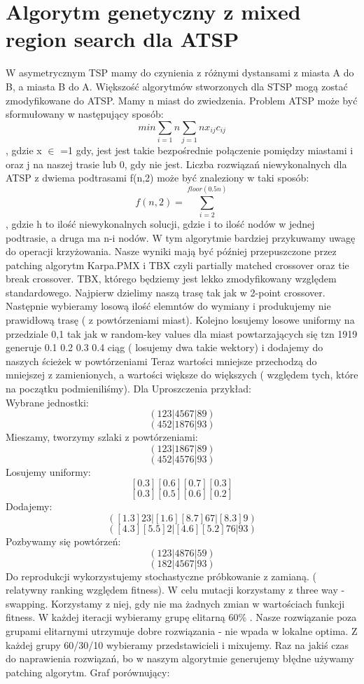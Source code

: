 \documentclass[11pt]{article}
\begin{document}
\section{Algorytm genetyczny z mixed region search dla ATSP}
W asymetrycznym TSP mamy do czynienia z różnymi dystansami z miasta A do B, a miasta B do A. Większość algorytmów stworzonych dla STSP mogą zostać zmodyfikowane do ATSP. Mamy n miast do zwiedzenia. Problem ATSP może być sformułowany w następujący sposób:
$$ min \sum_{i=1}{n}\sum_{j=1}{n}x_{ij}c_{ij}$$, gdzie x $\in$  =1 gdy, jest jest takie bezpośrednie połączenie pomiędzy miastami i oraz j na naszej trasie lub 0, gdy nie jest. Liczba rozwiązań niewykonalnych dla ATSP z dwiema podtrasami f(n,2) może być znaleziony w taki sposób: \\
$$f(n,2)=\sum_{i=2}^{floor(0.5n)}$$, gdzie h to ilość niewykonalnych solucji, gdzie i to ilość nodów w jednej podtrasie, a druga ma  n-i nodów. W tym algorytmie bardziej przykuwamy uwagę do operacji krzyżowania. Nasze wyniki mają być później przepuszczone przez patching algorytm Karpa.PMX i TBX czyli partially matched crossover oraz tie break crossover. TBX, którego będziemy jest lekko zmodyfikowany względem standardowego. Najpierw dzielimy naszą trasę tak jak w 2-point crossover. Następnie wybieramy losową ilość elemntów do wymiany i produkujemy nie prawidłową trasę ( z powtórzeniami miast). Kolejno losujemy losowe uniformy na przedziale 0,1 tak jak w random-key values dla miast powtarzających się tzn 1919 generuje 0.1 0.2 0.3 0.4 ciąg  ( losujemy dwa takie wektory) i dodajemy do naszych ścieżek w powtórzeniami Teraz wartości mniejsze przechodzą do mniejszej z zamienionych, a wartości większe do większych ( względem tych, które na początku podmieniliśmy). Dla Uproszczenia przykład:\\
Wybrane jednostki:\\
$$ (1 2 3 | 4 5 6 7 | 8 9)$$
$$ (4 5 2 | 1 8 7 6 | 9 3)$$
Mieszamy, tworzymy szlaki z powtórzeniami:\\
$$ (1 2 3 | 1 8 6 7 | 8 9)$$
$$ (4 5 2 | 4 5 7 6 | 9 3)$$
Losujemy uniformy:\\
$$ [0.3] [0.6] [0.7] [0.3] $$
$$ [0.3] [0.5] [0.6] [0.2] $$
Dodajemy:\\
$$ ([1.3] 2 3 | [1.6] [8.7] 6 7 | [8.3] 9)$$
$$ ([4.3] [5.5] 2 | [4.6] [5.2] 7 6 | 9 3)$$
Pozbywamy się powtórzeń:\\
$$ (1 2 3 | 4 8 7 6 | 5 9)$$
$$ (1 8 2 | 4 5 6 7 | 9 3)$$
Do reprodukcji wykorzystujemy stochastyczne próbkowanie z zamianą. ( relatywny ranking względem fitness). W celu mutacji korzystamy z three way -swapping. Korzystamy z niej, gdy nie ma żadnych zmian w wartościach funkcji fitness. W każdej iteracji wybieramy grupę elitarną 60\% . Nasze rozwiązanie poza grupami elitarnymi utrzymuje dobre rozwiązania - nie wpada w lokalne optima. Z każdej grupy 60/30/10 wybieramy przedstawicieli i mixujemy. Raz na jakiś czas do naprawienia rozwiązań, bo w naszym algorytmie generujemy błędne używamy patching algorytm. Graf porównujący:
\end{document}

